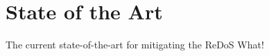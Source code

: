 \chapter{State of the Art}\label{chap:art}
The current state-of-the-art for mitigating the \acl{ReDoS} What!

